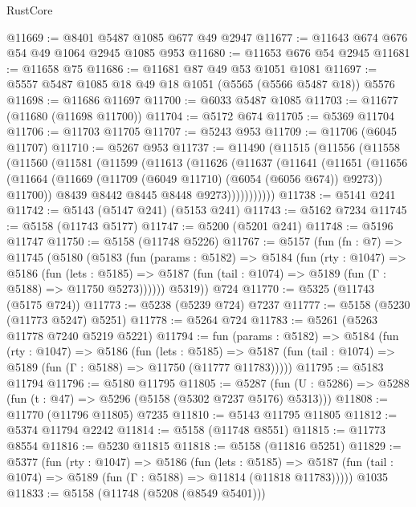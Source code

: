 \begin{lexlean}{RustCore}
\begin{coremodule}
@11669 := @8401 @5487 @1085 @677 @49 @2947
@11677 := @11643 @674 @676 @54 @49 @1064 @2945 @1085 @953
@11680 := @11653 @676 @54 @2945
@11681 := @11658 @75
@11686 := @11681 @87 @49 @53 @1051 @1081
@11697 := @5557 @5487 @1085 @18 @49 @18 @1051 (@5565 (@5566 @5487 @18)) @5576
@11698 := @11686 @11697
@11700 := @6033 @5487 @1085
@11703 := @11677 (@11680 (@11698 @11700))
@11704 := @5172 @674
@11705 := @5369 @11704
@11706 := @11703 @11705
@11707 := @5243 @953
@11709 := @11706 (@6045 @11707)
@11710 := @5267 @953
@11737 := @11490
    (@11515
      (@11556
        (@11558
          (@11560
            (@11581
              (@11599
                (@11613
                  (@11626
                    (@11637
                      (@11641
                        (@11651
                          (@11656
                            (@11664
                              (@11669 (@11709 (@6049 @11710) (@6054 (@6056 @674)) @9273))
                              @11700))
                          @8439
                          @8442
                          @8445
                          @8448
                          @9273)))))))))))
@11738 := @5141 @241
@11742 := @5143 (@5147 @241) (@5153 @241)
@11743 := @5162 @7234
@11745 := @5158 (@11743 @5177)
@11747 := @5200 (@5201 @241)
@11748 := @5196 @11747
@11750 := @5158 (@11748 @5226)
@11767 := @5157
    (fun (fn : @7) =>
    @11745
      (@5180
        (@5183
          (fun (params : @5182) =>
          @5184
            (fun (rty : @1047) =>
            @5186
              (fun (lets : @5185) =>
              @5187 (fun (tail : @1074) => @5189 (fun (Γ : @5188) => @11750 @5273))))))
        @5319))
    @724
@11770 := @5325 (@11743 (@5175 @724))
@11773 := @5238 (@5239 @724) @7237
@11777 := @5158 (@5230 (@11773 @5247) @5251)
@11778 := @5264 @724
@11783 := @5261 (@5263 @11778 @7240 @5219 @5221)
@11794 := fun (params : @5182) =>
  @5184
    (fun (rty : @1047) =>
    @5186
      (fun (lets : @5185) =>
      @5187 (fun (tail : @1074) => @5189 (fun (Γ : @5188) => @11750 (@11777 @11783)))))
@11795 := @5183 @11794
@11796 := @5180 @11795
@11805 := @5287
    (fun (U : @5286) => @5288 (fun (t : @47) => @5296 (@5158 (@5302 @7237 @5176) @5313)))
@11808 := @11770 (@11796 @11805) @7235
@11810 := @5143 @11795 @11805
@11812 := @5374 @11794 @2242
@11814 := @5158 (@11748 @8551)
@11815 := @11773 @8554
@11816 := @5230 @11815
@11818 := @5158 (@11816 @5251)
@11829 := @5377
    (fun (rty : @1047) =>
    @5186
      (fun (lets : @5185) =>
      @5187 (fun (tail : @1074) => @5189 (fun (Γ : @5188) => @11814 (@11818 @11783)))))
    @1035
@11833 := @5158 (@11748 (@5208 (@8549 @5401)))

\end{coremodule}
\end{lexlean}
